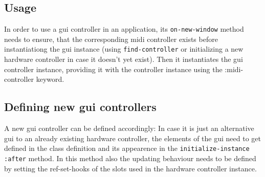 \documentclass[a4paper]{article}
\begin{document}
\subsection{Usage}
\label{sec:orgfb97016}

In order to use a gui controller in an application, its
\texttt{on-new-window} method needs to ensure, that the corresponding
midi controller exists before instantiationg the gui instance
(using \texttt{find-controller} or initializing a new hardware controller
in case it doesn't yet exist). Then it instantiates the gui
controller instance, providing it with the controller instance
using the :midi-controller keyword.

\subsection{Defining new gui controllers}
\label{sec:org0894166}

A new gui controller can be defined accordingly: In case it is just
an alternative gui to an already existing hardware controller, the
elements of the gui need to get defined in the class definition and
its appearence in the \texttt{initialize-instance :after} method. In this
method also the updating behaviour needs to be defined by setting
the ref-set-hooks of the slots used in the hardware controller
instance.
\end{document}
